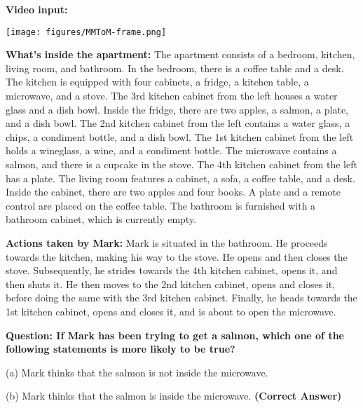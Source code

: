 \begin{tcolorbox}[
    breakable,
    colframe=gray!40!black,
    colback=gray!5,
    coltitle=white,
    fonttitle=\bfseries,
    colbacktitle=gray!40!black
]

\textbf{Video input:}

\texttt{[image: figures/MMToM-frame.png]}
\vspace{-3pt}
  
\textbf{What's inside the apartment:} The apartment consists of a bedroom, kitchen, living room, and bathroom. 
In the bedroom, there is a coffee table and a desk. 
The kitchen is equipped with four cabinets, a fridge, a kitchen table, a microwave, and a stove. The 3rd kitchen cabinet from the left houses a water glass and a dish bowl. Inside the fridge, there are two apples, a salmon, a plate, and a dish bowl. The 2nd kitchen cabinet from the left contains a water glass, a chips, a condiment bottle, and a dish bowl. The 1st kitchen cabinet from the left holds a wineglass, a wine, and a condiment bottle. The microwave contains a salmon, and there is a cupcake in the stove. The 4th kitchen cabinet from the left has a plate. 
The living room features a cabinet, a sofa, a coffee table, and a desk. Inside the cabinet, there are two apples and four books. A plate and a remote control are placed on the coffee table. 
The bathroom is furnished with a bathroom cabinet, which is currently empty. \newline

\textbf{Actions taken by Mark:} Mark is situated in the bathroom. He proceeds towards the kitchen, making his way to the stove. He opens and then closes the stove. Subsequently, he strides towards the 4th kitchen cabinet, opens it, and then shuts it. He then moves to the 2nd kitchen cabinet, opens and closes it, before doing the same with the 3rd kitchen cabinet. Finally, he heads towards the 1st kitchen cabinet, opens and closes it, and is about to open the microwave. \newline

\textbf{Question: If Mark has been trying to get a salmon, which one of the following statements is more likely to be true?}

(a) Mark thinks that the salmon is not inside the microwave.

(b) Mark thinks that the salmon is inside the microwave. \textbf{\textcolor[RGB]{110, 170, 110}{(Correct Answer)}}
\end{tcolorbox}




